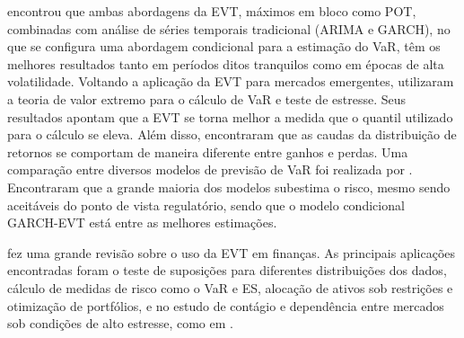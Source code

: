 \documentclass[1p]{elsarticle}
\theoremstyle{definition}
\begin{document}
\cite{Bystroem2004} encontrou que ambas abordagens da EVT, máximos em bloco como POT, combinadas com análise de séries temporais tradicional (ARIMA e GARCH), no que se configura uma abordagem condicional para a estimação do VaR, têm os melhores resultados tanto em períodos ditos tranquilos como em épocas de alta volatilidade. Voltando a aplicação da EVT para mercados emergentes, \cite{Gencay2004} utilizaram a teoria de valor extremo para o cálculo de VaR e teste de estresse. Seus resultados apontam que a EVT se torna melhor a medida que o quantil utilizado para o cálculo se eleva. Além disso, encontraram que as caudas da distribuição de retornos se comportam de maneira diferente entre ganhos e perdas. Uma comparação entre diversos modelos de previsão de VaR foi realizada por \cite{Kuester2006}. Encontraram que a grande maioria dos modelos subestima o risco, mesmo sendo aceitáveis do ponto de vista regulatório, sendo que o modelo condicional GARCH-EVT está entre as melhores estimações.




\cite{Rocco2014} fez uma grande revisão sobre o uso da EVT em finanças. As principais aplicações encontradas  foram o teste de suposições para diferentes distribuições dos dados, cálculo de medidas de risco como o VaR e ES, alocação de ativos sob restrições e otimização de portfólios, e no estudo de contágio e dependência entre mercados sob condições de alto estresse, como em \cite{Amarante2017}.
\end{document}
